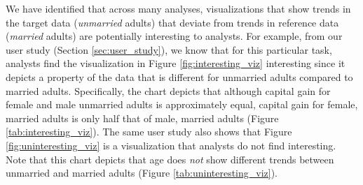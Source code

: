 \begin{example}
We have identified that across many analyses, 
visualizations that show trends in the target 
data ({\em unmarried} adults) that 
deviate from trends in reference data ({\em married}
adults) are potentially interesting to analysts.
For example, 
from our user study (Section \ref{sec:user_study}), 
we know that for this particular task,
analysts find the visualization in Figure \ref{fig:interesting_viz} 
interesting since it depicts 
a property of the data that is different for unmarried adults
compared to married adults.
Specifically, the chart depicts that although capital gain 
for female and male unmarried adults 
is approximately equal, capital gain for female, 
married adults is only half that of male, 
married adults (Figure \ref{tab:interesting_viz}).
The same user study also shows that Figure \ref{fig:uninteresting_viz} 
is a visualization that 
analysts do not find interesting. 
Note that this chart depicts that age does {\em not} show different trends between unmarried
and married adults (Figure \ref{tab:uninteresting_viz}).
\end{example}


